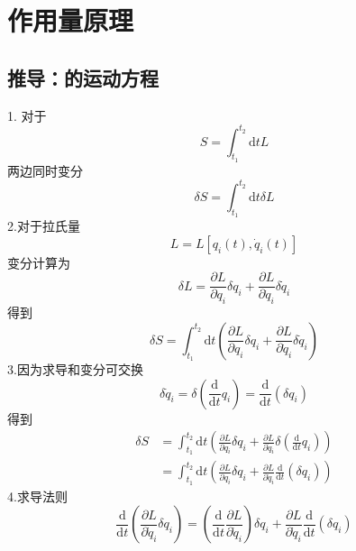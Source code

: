 \section{作用量原理}

\subsection{推导：的运动方程}
1.
对于
\begin{equation}
     S=\int_{t_1}^{t_2}{\mathrm{d}t}L
\end{equation}
两边同时变分
\begin{equation}
     \delta S=\int_{t_1}^{t_2}{\mathrm{d}t}\delta L
\end{equation}
2.对于拉氏量
\begin{equation}
    L=L[q_i(t),\dot{q}_i(t)]
\end{equation}
变分计算为
\begin{equation}
     \delta L=\frac{\partial L}{\partial q_i}\delta q_i+\frac{\partial L}{\partial \dot{q}_i}\delta \dot{q}_i
\end{equation}
得到
\begin{equation}
    \delta S=\int_{t_1}^{t_2}{\mathrm{d}t}\left( \frac{\partial L}{\partial q_i}\delta q_i+\frac{\partial L}{\partial \dot{q}_i}\delta \dot{q}_i \right) 
\end{equation}
3.因为求导和变分可交换
\begin{equation}
     \delta \dot{q}_i=\delta \left( \frac{\mathrm{d}}{\mathrm{d}t}q_i \right) =\frac{\mathrm{d}}{\mathrm{d}t}\left( \delta q_i \right) 
\end{equation}
得到
\begin{equation}
     \begin{aligned}
         \delta S&=\int_{t_1}^{t_2}{\mathrm{d}t}\left( \frac{\partial L}{\partial q_i}\delta q_i+\frac{\partial L}{\partial \dot{q}_i}\delta \left( \frac{\mathrm{d}}{\mathrm{d}t}q_i \right) \right) 
\\
&=\int_{t_1}^{t_2}{\mathrm{d}t}\left( \frac{\partial L}{\partial q_i}\delta q_i+\frac{\partial L}{\partial \dot{q}_i}\frac{\mathrm{d}}{\mathrm{d}t}\left( \delta q_i \right) \right) 
     \end{aligned}
\end{equation}
4.求导法则
\begin{equation}
    \frac{\mathrm{d}}{\mathrm{d}t}\left( \frac{\partial L}{\partial \dot{q}_i}\delta q_i \right) =\left( \frac{\mathrm{d}}{\mathrm{d}t}\frac{\partial L}{\partial \dot{q}_i} \right) \delta q_i+\frac{\partial L}{\partial \dot{q}_i}\frac{\mathrm{d}}{\mathrm{d}t}\left( \delta q_i \right) 
\end{equation}
